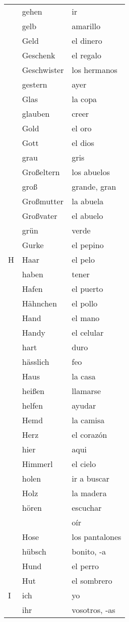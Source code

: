 \documentclass[10pt,spanish]{article}
\begin{document}
\begin{longtable}{p{} p{} | p{}}
& gehen & ir  \\
& gelb & amarillo  \\
& Geld & el dinero  \\
& Geschenk & el regalo \\
& Geschwister & los hermanos  \\
& gestern & ayer  \\
& Glas & la copa  \\
& glauben & creer \\
& Gold & el oro \\
& Gott & el dios \\
& grau & gris  \\
& Großeltern & los abuelos  \\
& groß & grande, gran  \\
& Großmutter & la abuela  \\
& Großvater & el abuelo  \\
& grün & verde  \\
& Gurke & el pepino \\
H & Haar & el pelo  \\
& haben & tener  \\
& Hafen & el puerto  \\
& Hähnchen & el pollo  \\
& Hand & el mano  \\
& Handy & el celular  \\
& hart & duro  \\
& hässlich & feo \\
& Haus & la casa  \\
& heißen & llamarse \\
& helfen & ayudar  \\
& Hemd & la camisa  \\
& Herz & el corazón \\
& hier & aqui  \\
& Himmerl & el cielo  \\
& holen & ir a buscar  \\
& Holz & la madera  \\
& hören & escuchar \\
& & oír \\
& Hose & los pantalones  \\
& hübsch & bonito, -a \\
& Hund & el perro  \\
& Hut & el sombrero  \\
I & ich & yo  \\
& ihr & vosotros, -as\\

\end{longtable}
\end{document}
